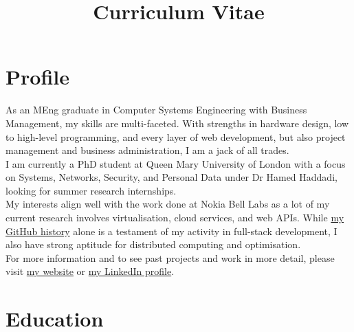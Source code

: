 \documentclass[10pt,a4paper,sans]{moderncv} %
\title{Curriculum Vitae}
\begin{document}
\makecvtitle

\section{Profile}

\hspace*{15pt}
As an MEng graduate in Computer Systems Engineering with Business Management, my skills are multi-faceted. With strengths in hardware design, low to high-level programming, and every layer of web development, but also project management and business administration, I am a jack of all trades.
\\[4pt]
\hspace*{15pt}
I am currently a PhD student at Queen Mary University of London with a focus on Systems, Networks, Security, and Personal Data under Dr Hamed Haddadi, looking for summer research internships.
\\[4pt]
\hspace*{15pt}
My interests align well with the work done at Nokia Bell Labs as a lot of my current research involves virtualisation, cloud services, and web APIs. While \href{https://github.com/yousefamar}{my GitHub history} alone is a testament of my activity in full-stack development, I also have strong aptitude for distributed computing and optimisation.
\\[4pt]
\hspace*{15pt}
For more information and to see past projects and work in more detail, please visit \href{http://yousefamar.com}{my website} or \href{https://linkedin.com/in/yousefamar}{my LinkedIn profile}.


\section{Education}
\end{document}
